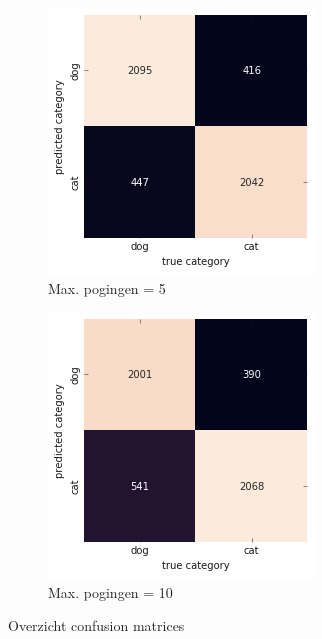 \begin{figure}
    \begin{subfigure}{0.5\textwidth}
        \centering
        \includegraphics[width=0.8\linewidth]{img/autokeras-5-confusion.png}
        \caption{Max. pogingen = 5}
        \label{fig:confusion-autokeras-5}
    \end{subfigure}
    \begin{subfigure}{0.5\textwidth}
        \centering
        \includegraphics[width=0.8\linewidth]{img/autokeras-10-confusion.png}
        \caption{Max. pogingen = 10}
        \label{fig:confusion-autokeras-10}
    \end{subfigure}
    \caption{Overzicht confusion matrices}
    \label{fig:confusion-matrices-autokeras}
\end{figure}

